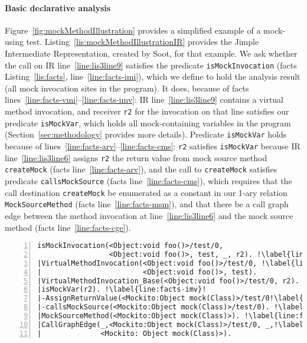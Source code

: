 \paragraph{Basic declarative analysis} Figure~\ref{fig:mockMethodIllustration} provides a simplified example of a mock-using test. Listing~\ref{lis:mockMethodIllustrationIR} provides the Jimple Intermediate Representation, created by Soot, for that example. We ask whether the call on IR line~\ref{line:lis3line9} satisfies the predicate \texttt{isMockInvocation} (facts Listing~\ref{lis:facts}, line~\ref{line:facts-imi}), which we define to hold the analysis result (all mock invocation sites in the program). It does, because of facts lines~\ref{line:facts-vmi}--\ref{line:facts-imv}: IR line~\ref{line:lis3line9} contains a virtual method invocation, and receiver \texttt{r2} for the invocation on that line satisfies our predicate \texttt{isMockVar}, which holds all mock-containing variables in the program (Section~\ref{sec:methodology} provides more details). Predicate \texttt{isMockVar} holds because of lines~\ref{line:facts-arv}--\ref{line:facts-cms}: \texttt{r2} satisfies \texttt{isMockVar} because IR line~\ref{line:lis3line6} assigns \texttt{r2} the return value from mock source method \texttt{createMock} (facts line~\ref{line:facts-arv}), and the call to \texttt{createMock} satisfies predicate \texttt{callsMockSource} (facts line~\ref{line:facts-cms}), which requires that the call destination \texttt{createMock} be enumerated as a constant in our 1-ary relation \texttt{MockSourceMethod} (facts line~\ref{line:facts-msm}), and that there be a call graph edge between the method invocation at line~\ref{line:lis3line6} and the mock source method (facts line~\ref{line:facts-cge}).


\begin{lstlisting}[basicstyle=\ttfamily, caption={Facts about invocation \texttt{r2.foo()} in method \texttt{test}.},
numbers=left,numbersep=2pt,basicstyle=\scriptsize\ttfamily, framesep=4.5mm, framexleftmargin=1.0mm, captionpos=b, label=lis:facts, escapechar=!, morekeywords={@Test}]
isMockInvocation(<Object:void foo()>/test/0, 
                 <Object:void foo()>, test, _, r2). !\label{line:facts-imi}!
|VirtualMethodInvocation(<Object:void foo()>/test/0, !\label{line:facts-vmi}!
|                        <Object:void foo()>, test).
|VirtualMethodInvocation_Base(<Object:void foo()>/test/0, r2).
|isMockVar(r2). !\label{line:facts-imv}!
|-AssignReturnValue(<Mockito:Object mock(Class)>/test/0!\label{line:facts-arv}!, r2).
|-callsMockSource(<Mockito:Object mock(Class)>/test/0). !\label{line:facts-cms}!
|MockSourceMethod(<Mockito:Object mock(Class)>). !\label{line:facts-msm}!
|CallGraphEdge(_,<Mockito:Object mock(Class)>/test/0, _,!\label{line:facts-cge}!
|              <Mockito: Object mock(Class)>). 
\end{lstlisting}


